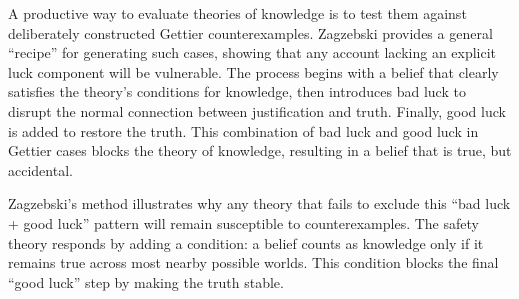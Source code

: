 A productive way to evaluate theories of knowledge is to test them against deliberately constructed Gettier counterexamples. Zagzebski provides a general “recipe” for generating such cases, showing that any account lacking an explicit luck component will be vulnerable. The process begins with a belief that clearly satisfies the theory’s conditions for knowledge, then introduces bad luck to disrupt the normal connection between justification and truth. Finally, good luck is added to restore the truth. This combination of bad luck and good luck in Gettier cases blocks the theory of knowledge, resulting in a belief that is true, but accidental.

Zagzebski’s method illustrates why any theory that fails to exclude this “bad luck + good luck” pattern will remain susceptible to counterexamples. The safety theory responds by adding a condition: a belief counts as knowledge only if it remains true across most nearby possible worlds. This condition blocks the final “good luck” step by making the truth stable.


